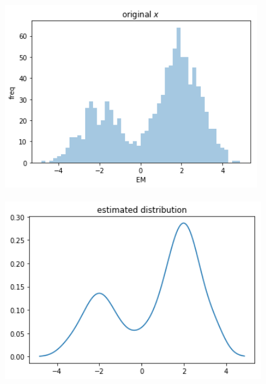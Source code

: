 \documentclass[11pt,a4paper,dvipdfmx]{article}
\theoremstyle{plain}
\newcommand{\1}{\mbox{1}\hspace{-0.25em}\mbox{l}}
\begin{document}
\begin{figure}[H]
  \centering
    \includegraphics[height=8cm]{image/original_x.png}
    \label{fig:fig1}
\end{figure}
\begin{figure}[H]
  \centering
    \includegraphics[height=8cm]{image/estimate_x.png}
    \label{fig:fig2}
\end{figure}
\end{document}
